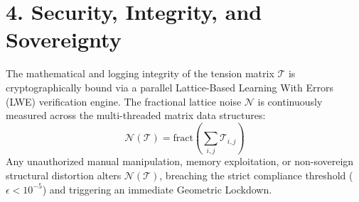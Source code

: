 \documentclass[a4paper,12pt]{article}
\begin{document}
\section*{4. Security, Integrity, and Sovereignty}
The mathematical and logging integrity of the tension matrix $\mathcal{T}$ is cryptographically bound via a parallel Lattice-Based Learning With Errors (LWE) verification engine. The fractional lattice noise $\mathcal{N}$ is continuously measured across the multi-threaded matrix data structures:
\[ \mathcal{N}(\mathcal{T}) = \text{fract} \left( \sum_{i,j} \mathcal{T}_{i,j} \right) \]
Any unauthorized manual manipulation, memory exploitation, or non-sovereign structural distortion alters $\mathcal{N}(\mathcal{T})$, breaching the strict compliance threshold ($\epsilon < 10^{-5}$) and triggering an immediate Geometric Lockdown.
\end{document}
